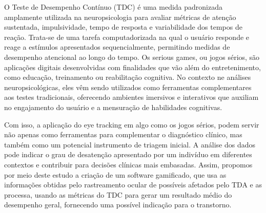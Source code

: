 O Teste de Desempenho Contínuo (TDC) é uma medida padronizada amplamente
utilizada na neuropsicologia para avaliar métricas de atenção sustentada, impulsividade,
tempo de resposta e variabilidade dos tempos de reação. Trata-se de uma tarefa
computadorizada na qual o usuário responde e reage a estímulos apresentados
sequencialmente, permitindo medidas de desempenho atencional ao longo do tempo. Os
serious games, ou jogos sérios, são aplicações digitais desenvolvidas com finalidades que
vão além do entretenimento, como educação, treinamento ou reabilitação cognitiva. No
contexto ne análises neuropsicológicas, eles vêm sendo utilizados como ferramentas
complementares aos testes tradicionais, oferecendo ambientes imersivos e interativos que
auxiliam no engajamento do usuário e a mensuração de habilidades cognitivas.

Com isso, a aplicação do eye tracking em algo como os jogos sérios, podem servir não
apenas como ferramentas para complementar o diagnóstico clínico, mas também como um
potencial instrumento de triagem inicial. A análise dos dados pode indicar o grau de
desatenção apresentado por um indivíduo em diferentes contextos e contribuir para decisões
clínicas mais embasadas. Assim, propomos por meio deste estudo a criação de um software
gamificado, que usa as informações obtidas pelo rastreamento ocular de possíveis afetados
pelo TDA e as processa, usando as métricas do TDC para gerar um resultado médio do
desempenho geral, fornecendo uma possível indicação para o transtorno.